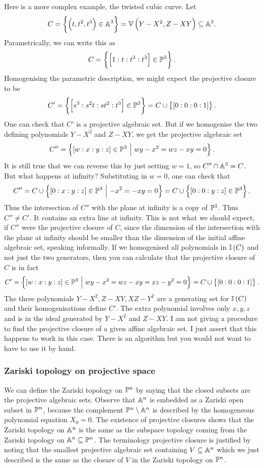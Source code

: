 \begin{example*}
Here is a more complex example, the twisted cubic curve. Let
$$ C = \cbr{\br{t, t^2, t^3} \in \AA^3} = \VV\br{Y - X^2, Z - XY} \subseteq \AA^3. $$
Parametrically, we can write this as
$$ C = \cbr{\sbr{1 : t : t^3 : t^3} \in \PP^3}. $$
Homogenising the parametric description, we might expect the projective closure to be
$$ C' = \cbr{\sbr{s^3 : s^2t : st^2 : t^3} \in \PP^3} = C \cup \cbr{\sbr{0 : 0 : 0 : 1}}. $$
One can check that $ C' $ is a projective algebraic set. But if we homogenise the two defining polynomials $ Y - X^2 $ and $ Z - XY $, we get the projective algebraic set
$$ C'' = \cbr{\sbr{w : x : y : z} \in \PP^3 \st wy - x^2 = wz - xy = 0}. $$
It is still true that we can reverse this by just setting $ w = 1 $, so $ C'' \cap \AA^3 = C $. But what happens at infinity? Substituting in $ w = 0 $, one can check that
$$ C'' = C \cup \cbr{\sbr{0 : x : y : z} \in \PP^3 \st -x^2 = -xy = 0} = C \cup \cbr{\sbr{0 : 0 : y : z} \in \PP^3}. $$
Thus the intersection of $ C'' $ with the plane at infinity is a copy of $ \PP^1 $. Thus $ C'' \ne C' $. It contains an extra line at infinity. This is not what we should expect, if $ C'' $ were the projective closure of $ C $, since the dimension of the intersection with the plane at infinity should be smaller than the dimension of the initial affine algebraic set, speaking informally. If we homogenised all polynomials in $ \II\br{C} $ and not just the two generators, then you can calculate that the projective closure of $ C $ is in fact
$$ C' = \cbr{\sbr{w : x : y : z} \in \PP^3 \st wy - x^2 = wz - xy = xz - y^2 = 0} = C \cup \cbr{\sbr{0 : 0 : 0 : 1}}. $$
The three polynomials $ Y - X^2, Z - XY, XZ - Y^2 $ are a generating set for $ \II\br{C} $ and their homogenisations define $ C' $. The extra polynomial involves only $ x, y, z $ and is in the ideal generated by $ Y - X^2 $ and $ Z - XY $. I am not giving a procedure to find the projective closure of a given affine algebraic set. I just assert that this happens to work in this case. There is an algorithm but you would not want to have to use it by hand.
\end{example*}

\pagebreak

\subsubsection{Zariski topology on projective space}

We can define the Zariski topology on $ \PP^n $ by saying that the closed subsets are the projective algebraic sets. Observe that $ \AA^n $ is embedded as a Zariski open subset in $ \PP^n $, because the complement $ \PP^n \setminus \AA^n $ is described by the homogeneous polynomial equation $ X_0 = 0 $. The existence of projective closures shows that the Zariski topology on $ \AA^n $ is the same as the subspace topology coming from the Zariski topology on $ \AA^n \subseteq \PP^n $. The terminology projective closure is justified by noting that the smallest projective algebraic set containing $ V \subseteq \AA^n $ which we just described is the same as the closure of $ V $ in the Zariski topology on $ \PP^n $.

